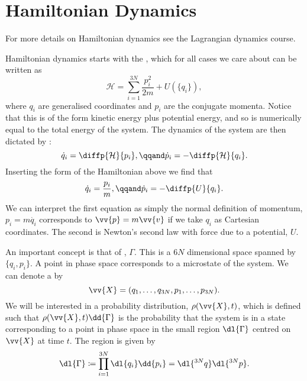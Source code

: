 \documentclass[fleqn]{NotesClass}
\newcommand*{\hamiltonian}{\mathcal{H}}
\begin{document}
    \section{Hamiltonian Dynamics}
    \begin{rmk}
        For more details on Hamiltonian dynamics see the Lagrangian dynamics course.
    \end{rmk}
    \vspace{5pt}
    Hamiltonian dynamics starts with the , which for all cases we care about can be written as
    \begin{equation}
        \hamiltonian = \sum_{i = 1}^{3N} \frac{p_i^2}{2m} + U(\{q_i\}),
    \end{equation}
    where \(q_i\) are generalised coordinates and \(p_i\) are the conjugate momenta.
    Notice that this is of the form kinetic energy plus potential energy, and so is numerically equal to the total energy of the system.
    The dynamics of the system are then dictated by :
    \begin{equation}
        \dot{q}_i = \diffp{\hamiltonian}{p_i}, \qqand \dot{p}_i = -\diffp{\hamiltonian}{q_i}.
    \end{equation}
    Inserting the form of the Hamiltonian above we find that
    \begin{equation}
        \dot{q}_i = \frac{p_i}{m}, \qqand \dot{p}_i = -\diffp{U}{q_i}.
    \end{equation}
    We can interpret the first equation as simply the normal definition of momentum, \(p_i = m\dot{q_i}\) corresponds to \(\vv{p} = m\vv{v}\) if we take \(q_i\) as Cartesian coordinates.
    The second is Newton's second law with force due to a potential, \(U\).
    
    An important concept is that of , \(\Gamma\).
    This is a \(6N\) dimensional space spanned by \(\{q_i, p_i\}\).
    A point in phase space corresponds to a microstate of the system.
    We can denote a  by
    \begin{equation}
        \vv{X} = (q_1, \dotsc, q_{3N}, p_1, \dotsc, p_{3N}).
    \end{equation}
    We will be interested in a probability distribution, \(\rho(\vv{X}, t)\), which is defined such that \(\rho(\vv{X}, t) \dd{\Gamma}\) is the probability that the system is in a state corresponding to a point in phase space in the small region \(\dl{\Gamma}\) centred on \(\vv{X}\) at time \(t\).
    The region is given by
    \begin{equation}
        \dl{\Gamma} \coloneqq \prod_{i = 1}^{3N} \dl{q_i}\dd{p_i} = \dl{^{3N}q}\dl{^{3N}p}.
    \end{equation}
    
\end{document}
